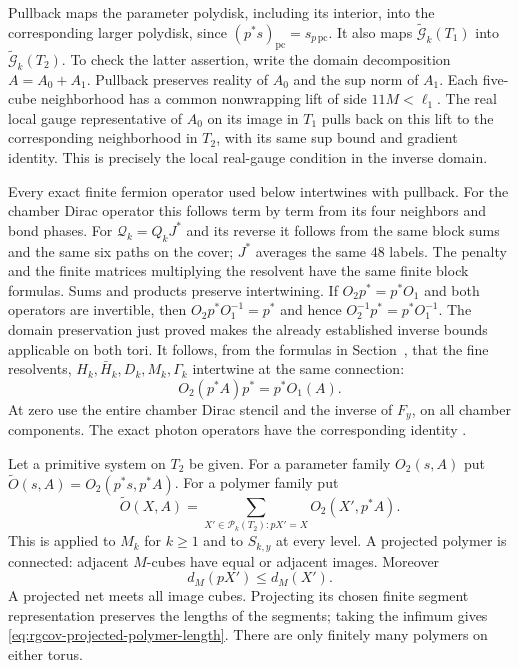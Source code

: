 Pullback maps the parameter polydisk, including its interior,
into the corresponding larger polydisk, since
$(p^*s)_{\mathrm{pc}}=s_{p\,\mathrm{pc}}$.
It also maps
$\widetilde{\mathcal G}_k(T_1)$ into
$\widetilde{\mathcal G}_k(T_2)$.
To check the latter assertion, write the domain decomposition
$A=A_0+A_1$. Pullback preserves reality of $A_0$ and
the sup norm of $A_1$. Each five-cube neighborhood has
a common nonwrapping lift of side $11M<\ell_1$.
The real local gauge representative of $A_0$ on its
image in $T_1$ pulls back on this lift to the
corresponding neighborhood in $T_2$, with its same
sup bound and gradient identity. This is precisely
the local real-gauge condition in the inverse domain.

Every exact finite fermion operator used below intertwines
with pullback. For the chamber Dirac operator this follows
term by term from its four neighbors and bond phases.
For $\mathcal Q_k=Q_kJ^*$ and its reverse it follows from
the same block sums and the same six paths on the cover;
$J^*$ averages the same $48$ labels.
The penalty and the finite matrices multiplying the
resolvent have the same finite block formulas.
Sums and products preserve intertwining.
If $O_2p^*=p^*O_1$ and both operators are invertible,
then
$O_2p^*O_1^{-1}=p^*$ and hence
$O_2^{-1}p^*=p^*O_1^{-1}$.
The domain preservation just proved makes the already
established inverse bounds applicable on both tori.
It follows, from the formulas in Section~,
that the fine resolvents, $H_k,\bar H_k,D_k,M_k,\Gamma_k$
intertwine at the same connection:
\begin{equation}\label{eq:rgcov-exact-fermion-intertwining}
 O_2(p^*A)p^*=p^*O_1(A).
\end{equation}
At zero use the entire chamber Dirac stencil and the
inverse of $F_y$, on all chamber components.
The exact photon operators have the corresponding
identity .

Let a primitive system on $T_2$ be given.
For a parameter family $O_2(s,A)$ put
$\widetilde O(s,A)=O_2(p^*s,p^*A)$.
For a polymer family put
\[
 \widetilde O(X,A)=\sum_{X'\in\mathcal P_k(T_2):pX'=X}
                                                    O_2(X',p^*A).
\]
This is applied to $M_k$ for $k\ge1$ and to $S_{k,y}$
at every level. A projected polymer is connected:
adjacent $M$-cubes have equal or adjacent images.
Moreover
\begin{equation}\label{eq:rgcov-projected-polymer-length}
                           d_M(pX')\le d_M(X').
\end{equation}
A projected net meets all image cubes. Projecting its chosen
finite segment representation preserves the lengths of the segments;
taking the infimum gives \eqref{eq:rgcov-projected-polymer-length}.
There are only finitely many polymers on either torus.

